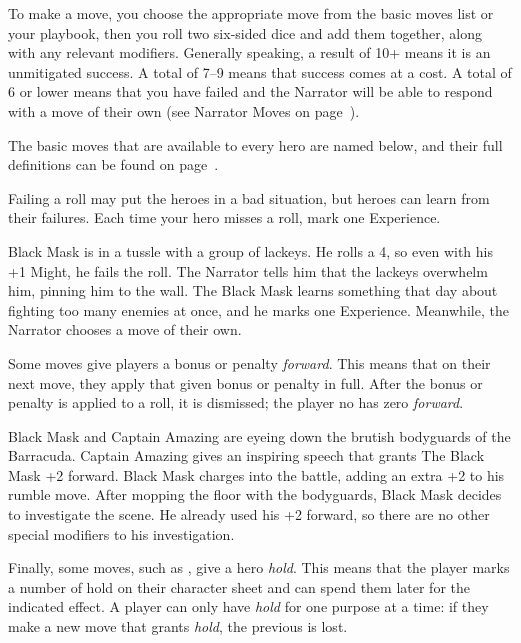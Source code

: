 \documentclass[letterpaper]{report}
\begin{document}
To make a move, you choose the appropriate move from the basic moves
list or your playbook, then you roll two six-sided dice and add them
together, along with any relevant modifiers.  Generally speaking, a
result of 10+ means it is an unmitigated success. A total of 7--9
means that success comes at a cost. A total of 6 or lower means that
you have failed and the Narrator will be able to respond with a move
of their own (see Narrator Moves on page~\pageref{sec:narrator-moves}).

The basic moves that are available to every hero are named below,
and their full definitions can be found on page~\pageref{sec:basic-moves}.
\newenvironment{movedef}[\movedefarity]
{\item #1}{}
\begin{itemize}
  \setlength\itemsep{0px}
  
\end{itemize}

Failing a roll may put the heroes in a bad situation, but heroes
can learn from their failures.
Each time your hero misses a roll, mark one Experience.

\begin{example}
  Black Mask is in a tussle with a group of lackeys.
  He rolls a 4, so even with his +1 Might, he fails the roll.
  The Narrator tells him that the lackeys overwhelm him,
  pinning him to the wall. The Black Mask learns something
  that day about fighting too many enemies at once, and
  he marks one Experience. Meanwhile, the Narrator chooses
  a move of their own.
\end{example}

Some moves give players a bonus or penalty \emph{forward}.
This means that on their next move, they apply that given bonus
or penalty in full. After the bonus or penalty is applied to a roll,
it is dismissed; the player no has zero \emph{forward}.

\begin{example}
  Black Mask and Captain Amazing are eyeing down
  the brutish bodyguards of the Barracuda.
  Captain Amazing gives an inspiring speech that grants
  The Black Mask +2 forward.
  Black Mask charges into the battle, adding an extra +2 to
  his rumble move. After mopping the floor with the bodyguards,
  Black Mask decides to investigate the scene. He already
  used his +2 forward, so there are no other special modifiers
  to his investigation.
\end{example}

Finally, some moves, such as , give a hero \emph{hold}.
This means that the player marks a number of hold on their character
sheet and can spend them later for the indicated effect.
A player can only have \emph{hold} for one purpose at a time:
if they make a new move that grants \emph{hold}, the previous is lost.
\end{document}
